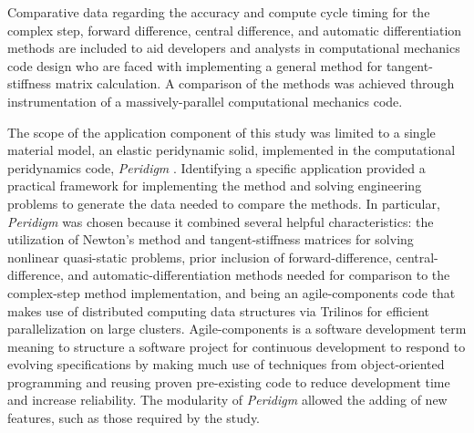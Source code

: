 \documentclass[preprint,12pt]{elsarticle}
\begin{document}
Comparative data regarding the accuracy and compute cycle timing for the
complex step, forward difference, central difference, and automatic differentiation methods are included to aid developers and analysts in computational mechanics code design who are faced with implementing a general
method for tangent-stiffness matrix calculation.  A comparison of the methods was achieved through instrumentation of a massively-parallel computational mechanics code. 

The scope of the application component of this study was limited to a single material model, an elastic peridynamic solid, implemented in the computational peridynamics code, \textit{Peridigm} \cite{peridigm}. Identifying a specific application provided a practical framework for implementing the   method and solving engineering problems to generate the data needed to compare the methods. In particular, \emph{Peridigm} was chosen because it combined several helpful characteristics: the utilization of Newton's method and tangent-stiffness matrices for solving nonlinear quasi-static problems, prior inclusion of forward-difference, central-difference, and automatic-differentiation methods needed for comparison to the complex-step method implementation, and being an agile-components code that makes use of distributed computing data structures via Trilinos \cite{trilinos} for efficient parallelization on large clusters. Agile-components is a software development term meaning to structure a software project for continuous development to respond to evolving specifications by making much use of techniques from object-oriented programming and reusing proven pre-existing code to reduce development time and increase reliability. The modularity of \emph{Peridigm} allowed the adding of new features, such as those required by the study.
\end{document}
